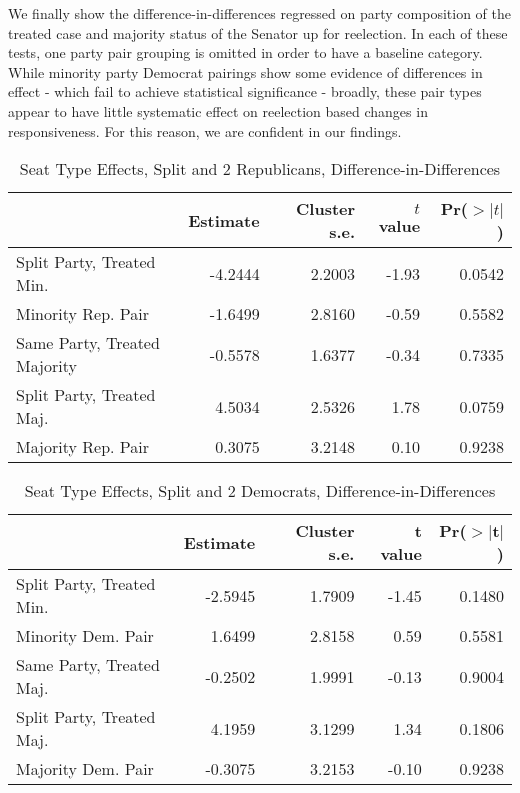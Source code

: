 \documentclass[12pt]{article}
\begin{document}
We finally show the difference-in-differences regressed on party composition of the treated case and majority status of the Senator up for reelection. In each of these tests, one party pair grouping is omitted in order to have a baseline category. While minority party Democrat pairings show some evidence of differences in effect - which fail to achieve statistical significance - broadly, these pair types appear to have little systematic effect on reelection based changes in responsiveness. For this reason, we are confident in our findings.

\begin{table}[H]
	\centering
	\singlespacing
	\caption{Seat Type Effects, Split and 2 Republicans, Difference-in-Differences} 
	\begin{tabular}{lrrrr}
		\hline
		& Estimate & Cluster s.e. & $t$ value & Pr($>|t|$) \\ 
		\hline
		Split Party, Treated Min. & -4.2444 & 2.2003 & -1.93 & 0.0542 \\ 
		Minority Rep. Pair & -1.6499 & 2.8160 & -0.59 & 0.5582 \\ 
		Same Party, Treated Majority & -0.5578 & 1.6377 & -0.34 & 0.7335 \\
		Split Party, Treated Maj. & 4.5034 & 2.5326 & 1.78 & 0.0759 \\ 
		Majority Rep. Pair & 0.3075 & 3.2148 & 0.10 & 0.9238 \\ 
		\hline
	\end{tabular}
\end{table}

\begin{table}[H]
	\centering
	\singlespacing
	\caption{Seat Type Effects, Split and 2 Democrats, Difference-in-Differences} 
	\begin{tabular}{lrrrr}
		\hline
		& Estimate & Cluster s.e. & t value & Pr($>$$|$t$|$) \\ 
		\hline
		Split Party, Treated Min. & -2.5945 & 1.7909 & -1.45 & 0.1480 \\ 
		Minority Dem. Pair & 1.6499 & 2.8158 & 0.59 & 0.5581 \\ 
		Same Party, Treated Maj. & -0.2502 & 1.9991 & -0.13 & 0.9004 \\
		Split Party, Treated Maj. & 4.1959 & 3.1299 & 1.34 & 0.1806 \\ 
		Majority Dem. Pair & -0.3075 & 3.2153 & -0.10 & 0.9238 \\ 
		\hline
	\end{tabular}
\end{table}
\end{document}
